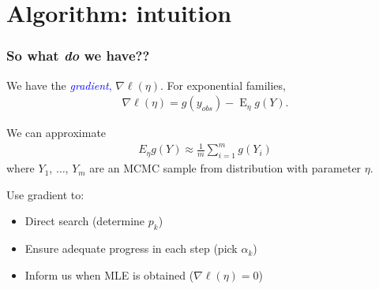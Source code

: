 \documentclass[ 10pt]{beamer}
\DeclareMathOperator{\E}{E}
\begin{document}
\section{Algorithm: intuition}
\frame
{
\frametitle{So what \emph{do} we have??}

We have the  {\textcolor{blue}{\emph{gradient},} $\nabla \ell(\eta)$.}
For exponential families,
\begin{align*}
	\nabla \ell( \eta ) = g(y_{obs}) - \E_{\eta} g(Y).
\end{align*}

We can approximate
\begin{align*}
E_\eta g(Y) \approx \frac{1}{m}\sum_{i = 1}^m g(Y_i)
\end{align*}
where $Y_1$, $\ldots$, $Y_m$ are an MCMC sample from distribution with parameter $\eta$.
\vspace*{4mm}

\pause
Use gradient to: 
\vspace*{2mm}
\begin{itemize}
\item Direct search  (determine $p_k$)
\vspace*{2mm}

\item Ensure adequate progress  in each step  (pick $\alpha_k$)
\vspace*{2mm}

\item Inform us when MLE is obtained  ($\nabla \ell(\eta) = 0$)
\end{itemize}

}

%
%
%
\end{document}
